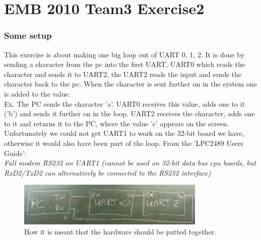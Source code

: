 

\part*{EMB 2010 Team3 Exercise2}
\section{Some setup}
This exercise is about making one big loop out of UART 0, 1, 2.
It is done by sending a character from the pc into the first UART, UART0 which reads the character and sends it to
UART2, the UART2 reads the input and sends the character back to the pc. When the character is sent further on in the system
one is added to the value.\\
Ex. The PC sends the character 'a'. UART0 receives this value, adds one to it ('b') and sends it further on in the loop. 
UART2 receives the character, adds one to it and returns it to the PC, where the value 'c' appears on the screen.\\
Unfortunately we could not get UART1 to work on the 32-bit board we have, otherwise it would also have been part of the loop.
From the 'LPC2489 Users Guide':
\\ \textit{ Full modem RS232 on UART1 (cannot be used on 32-bit data bus cpu boards, 
but RxD2/TxD2 can alternatively be connected to the RS232 interface)}

\begin{figure}[h!]		%
 \begin{centering}
  \includegraphics[width=0.8\textwidth]{setupbb.jpg}
   \caption{How it is meant that the hardware should be putted together. }
 \end{centering}
\end{figure}

